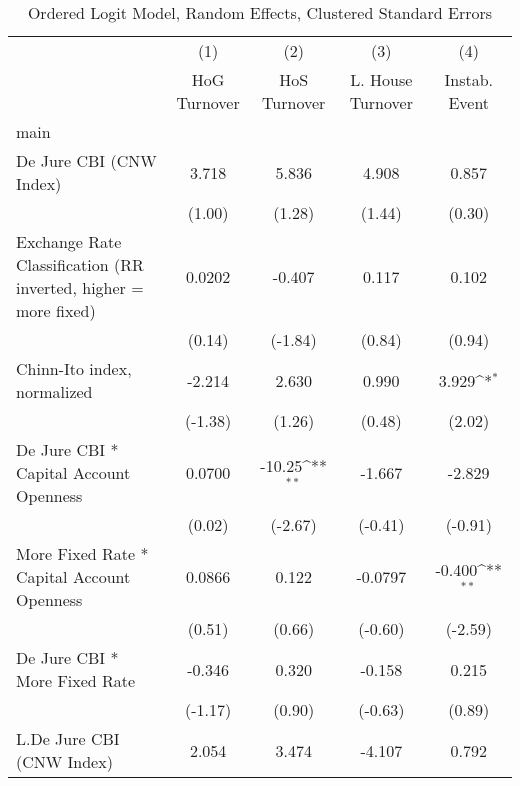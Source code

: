 {
\def\sym#1{\ifmmode^{#1}\else\(^{#1}\)\fi}
\begin{longtable}{l*{4}{c}}
\caption{Ordered Logit Model, Random Effects, Clustered Standard Errors \label{kapintlagordLogLogDJ}}\\
\hline\hline\endfirsthead\hline\endhead\hline\endfoot\endlastfoot
                &\multicolumn{1}{c}{(1)}&\multicolumn{1}{c}{(2)}&\multicolumn{1}{c}{(3)}&\multicolumn{1}{c}{(4)}\\
                &\multicolumn{1}{c}{HoG Turnover}&\multicolumn{1}{c}{HoS Turnover}&\multicolumn{1}{c}{L. House Turnover}&\multicolumn{1}{c}{Instab. Event}\\
\hline
main            &                  &                  &                  &                  \\
De Jure CBI (CNW Index)&    3.718         &    5.836         &    4.908         &    0.857         \\
                &   (1.00)         &   (1.28)         &   (1.44)         &   (0.30)         \\
[1em]
Exchange Rate Classification (RR inverted, higher = more fixed)&   0.0202         &   -0.407         &    0.117         &    0.102         \\
                &   (0.14)         &  (-1.84)         &   (0.84)         &   (0.94)         \\
[1em]
Chinn-Ito index, normalized&   -2.214         &    2.630         &    0.990         &    3.929\sym{*}  \\
                &  (-1.38)         &   (1.26)         &   (0.48)         &   (2.02)         \\
[1em]
De Jure CBI * Capital Account Openness&   0.0700         &   -10.25\sym{**} &   -1.667         &   -2.829         \\
                &   (0.02)         &  (-2.67)         &  (-0.41)         &  (-0.91)         \\
[1em]
More Fixed Rate * Capital Account Openness&   0.0866         &    0.122         &  -0.0797         &   -0.400\sym{**} \\
                &   (0.51)         &   (0.66)         &  (-0.60)         &  (-2.59)         \\
[1em]
De Jure CBI * More Fixed Rate&   -0.346         &    0.320         &   -0.158         &    0.215         \\
                &  (-1.17)         &   (0.90)         &  (-0.63)         &   (0.89)         \\
[1em]
L.De Jure CBI (CNW Index)&    2.054         &    3.474         &   -4.107         &    0.792         \\

\end{longtable}}
